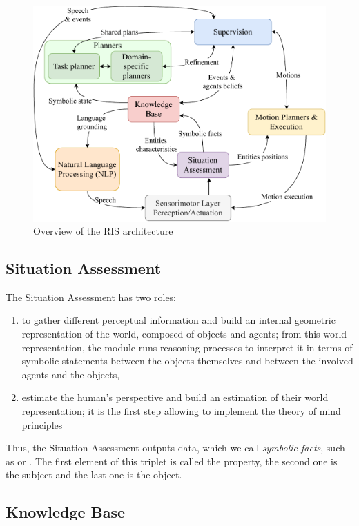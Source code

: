 \documentclass[a4paper,11pt,twoside]{StyleThese}
\begin{document}
\begin{figure}[!ht]
	\includegraphics[width=\linewidth]{figures/chapter2/archi_overview.pdf}
	\caption{Overview of the RIS architecture}
	\label{chap2:fig:archi}
\end{figure}


\subsection{Situation Assessment}
The Situation Assessment has two roles:
\begin{enumerate}
	\item  to gather different perceptual information and build an internal geometric representation of the world, composed of objects and agents; from this world representation, the module runs reasoning processes to interpret it in terms of symbolic statements between the objects themselves and between the involved agents and the objects,
	\item estimate the human's perspective and build an estimation of their world representation; it is the first step allowing to implement the theory of mind principles \cite{baron_1985_does}
\end{enumerate}

Thus, the Situation Assessment outputs data, which we call \textit{symbolic facts}, such as  or . The first element of this triplet is called the property, the second one is the subject and the last one is the object.

\subsection{Knowledge Base}
\end{document}
